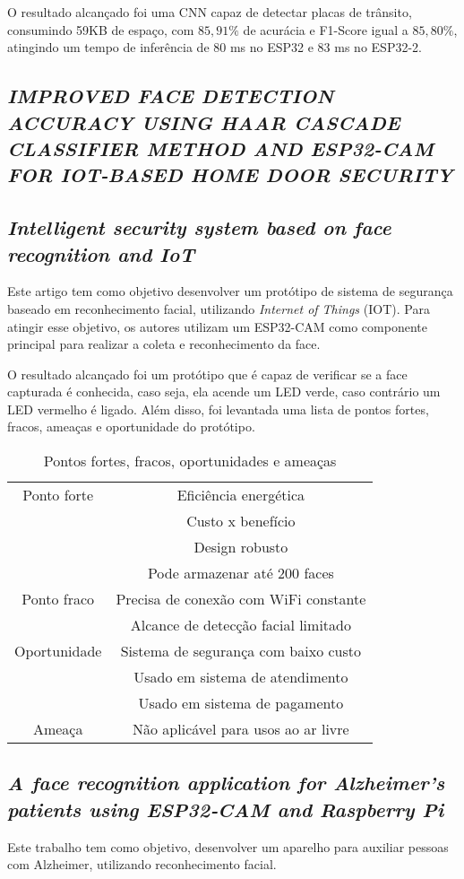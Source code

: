 O resultado alcançado foi uma CNN capaz de detectar placas de trânsito, consumindo 59KB de espaço, com $85,91\%$ de
acurácia e F1-Score igual a $85,80\%$, atingindo um tempo de inferência de 80 ms no ESP32 e 83 ms no ESP32-2.

\subsection{\textit{IMPROVED FACE DETECTION ACCURACY USING HAAR CASCADE CLASSIFIER METHOD AND ESP32-CAM FOR IOT-BASED HOME DOOR SECURITY}}

\subsection{\textit{Intelligent security system based on face recognition and IoT}}
Este artigo \cite{bagchi20222133} tem como objetivo desenvolver um protótipo de sistema de segurança baseado em reconhecimento facial,
utilizando \textit{Internet of Things} (IOT). Para atingir esse objetivo, os autores utilizam um ESP32-CAM como componente
principal para realizar a coleta e reconhecimento da face.

O resultado alcançado foi um protótipo que é capaz de verificar se a face capturada é conhecida, caso seja, ela acende um
LED verde, caso contrário um LED vermelho é ligado. Além disso, foi levantada uma lista de pontos fortes, fracos, ameaças
e oportunidade do protótipo.

\begin{center}
\begin{table}[htb]
\centering
\ABNTEXfontereduzida
\caption[Pontos fortes, fracos, oportunidades e ameaças]{Pontos fortes, fracos, oportunidades e ameaças}
\label{tabela_swot}
\begin{tabular}{ |c|c| }
	\hline
	Ponto forte & Eficiência energética \\
		    & Custo x benefício \\
		    & Design robusto \\
		    & Pode armazenar até 200 faces \\
	\hline
	Ponto fraco & Precisa de conexão com WiFi constante \\
	 	    & Alcance de detecção facial limitado \\
	\hline
	Oportunidade & Sistema de segurança com baixo custo\\
		 & Usado em sistema de atendimento \\
		 & Usado em sistema de pagamento \\
	\hline
	Ameaça & Não aplicável para usos ao ar livre \\
	\hline
\end{tabular}
\end{table}
\end{center}

\subsection{\textit{A face recognition application for Alzheimer’s patients using ESP32‑CAM and Raspberry Pi}}
Este trabalho \cite{} tem como objetivo, desenvolver um aparelho para auxiliar pessoas com Alzheimer, utilizando reconhecimento
facial.
